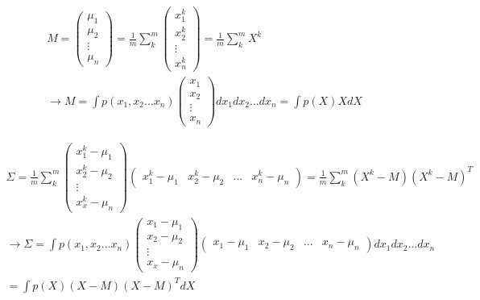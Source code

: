 \begin{gather}
    M=\begin{pmatrix}
        \mu_{1}\\
        \mu_{2}\\
        \vdots \\
        \mu_{n}
    \end{pmatrix}
    =\frac{1}{m}\sum_{k}^{m}
    \begin{pmatrix}
        x_{1}^{k}\\
        x_{2}^{k}\\
        \vdots \\
        x_{n}^{k}
    \end{pmatrix}
    =\frac{1}{m}\sum_{k}^{m} X^{k}\\
    \rightarrow M = \int p(x_{1},x_{2}...x_{n})
    \begin{pmatrix}
        x_{1}\\
        x_{2}\\
        \vdots \\
        x_{n}
    \end{pmatrix}
    dx_{1}dx_{2}...dx_{n}
    = \int p(X) X dX
\end{gather}

\begin{gather}
    \Sigma = \frac{1}{m} \sum_{k}^{m}
    \begin{pmatrix}
        x_{1}^{k}-\mu_{1}\\
        x_{2}^{k}-\mu_{2}\\
        \vdots \\
        x_{x}^{k}-\mu_{n}
    \end{pmatrix}
    \begin{pmatrix}
        x_{1}^{k}-\mu_{1}&x_{2}^{k}-\mu_{2}&...&x_{n}^{k}-\mu_{n}
    \end{pmatrix}
    =\frac{1}{m} \sum_{k}^{m} (X^{k}-M)(X^{k}-M)^{T}\\
    \rightarrow \Sigma = \int p(x_{1},x_{2}...x_{n})
    \begin{pmatrix}
        x_{1}-\mu_{1}\\
        x_{2}-\mu_{2}\\
        \vdots \\
        x_{x}-\mu_{n}
    \end{pmatrix}
    \begin{pmatrix}
        x_{1}-\mu_{1}&x_{2}-\mu_{2}&...&x_{n}-\mu_{n}
    \end{pmatrix}
    dx_{1}dx_{2}...dx_{n}\\
    = \int p(X) (X-M)(X-M)^{T} dX
\end{gather}

